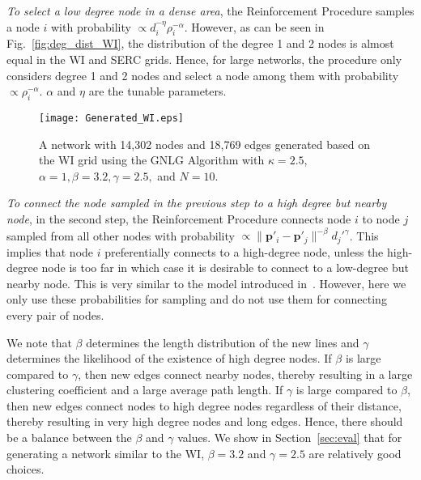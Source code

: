 \documentclass[10pt,journal]{IEEEtran}
\begin{document}
\emph{To select a low degree node in a dense area},
the Reinforcement Procedure samples a node $i$ with probability $\propto d_i ^{-\eta}\rho_i^{-\alpha}$. However, as can be seen in Fig.~\ref{fig:deg_dist_WI}, the distribution of the degree 1 and 2 nodes is almost equal in the WI and SERC grids.
Hence, for large networks, the procedure only considers degree 1 and 2 nodes and select a node among them with probability $\propto \rho_i^{-\alpha}$. $\alpha$ and $\eta$ are the tunable parameters.

\begin{figure}[t]
\centering
\vspace*{-0.2cm}
\texttt{[image: Generated\_WI.eps]}
\vspace*{-0.2cm}
\caption{A network with 14,302 nodes and 18,769 edges generated based on the WI grid using the GNLG Algorithm with $\kappa=2.5$, $\alpha = 1, \beta = 3.2, \gamma = 2.5,$ and $N=10$.}
\label{fig:Generated_WI}
\vspace*{0.2cm}
\end{figure}


\emph{To connect the node sampled in the previous step to a high degree but nearby node}, in the second step, the Reinforcement Procedure connects node $i$ to node $j$ sampled from all other nodes with probability $\propto \|\textbf{p}'_i-\textbf{p}'_j\|^{-\beta} d_j'^{\gamma}$.
This implies that node $i$ preferentially connects to a high-degree node, unless the high-degree node is too far in which case it is desirable to connect to a low-degree but nearby node. This is very similar to the model introduced in~\cite{manna2002modulated,xulvi2002evolving}. However, here we only use these probabilities for sampling and do not use them for connecting every pair of nodes.


We note that $\beta$ determines the length distribution of the new lines and $\gamma$ determines the likelihood of the existence of high degree nodes. If $\beta$ is large compared to $\gamma$, then new edges connect nearby nodes, thereby resulting in a large clustering coefficient and  a large average path length. If $\gamma$ is large compared to $\beta$, then new edges connect nodes to high degree nodes regardless of their distance, thereby resulting in very high degree nodes and long edges. Hence, there should be a balance between the $\beta$ and $\gamma$ values. We show in Section~\ref{sec:eval} that for generating a network similar to the WI, $\beta=3.2$ and $\gamma=2.5$ are relatively good choices.
\end{document}

